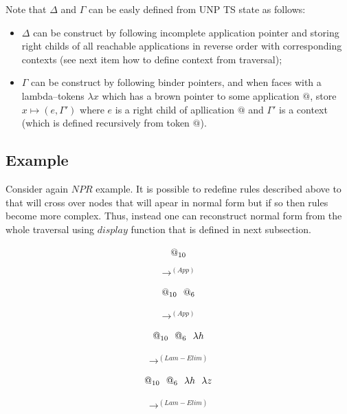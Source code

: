 \documentclass[a4paper, 10pt]{article}
\newcommand{\tikzmark}[3][]{\tikz[remember picture,baseline] \node [inner xsep=0pt,anchor=base,#1](#2) {#3};}
\begin{document}
Note that $\Delta$ and $\Gamma$ can be easly defined from UNP TS state as follows:
\begin{itemize}
\item $\Delta$ can be construct by following incomplete application pointer and storing right childs of all reachable applications in reverse order with corresponding contexts (see next item how to define context from traversal);
\item $\Gamma$ can be construct by following binder pointers, and when faces with a lambda--tokens $\lambda x$ which has a brown pointer to some application $@$, store $x \mapsto (e, \Gamma')$ where $e$ is a right child of apllication $@$ and $\Gamma'$ is a context (which is defined recursively from token $@$).
\end{itemize}

\subsection{Example}
Consider again $NPR$ example. It is possible to redefine rules described above to that will cross over nodes that will apear in normal form but if so then rules become more complex. Thus, instead one can reconstruct normal form from the whole traversal using $display$ function that is defined in next subsection.

\[\tikzmark{}{$@_{10}$}\]
$$\rightarrow^{(App)}$$

\[\tikzmark{1}{$@_{10}$}\ \ \tikzmark{2}{$@_6$}\]
$$\rightarrow^{(App)}$$

\[\tikzmark{1}{$@_{10}$}\ \ \tikzmark{2}{$@_6$}\ \ \tikzmark{3}{$\lambda h$}\]
$$\rightarrow^{(Lam-Elim)}$$

\[\tikzmark{1}{$@_{10}$}\ \ \tikzmark{2}{$@_6$}\ \ \tikzmark{3}{$\lambda h$}\ \ \tikzmark{4}{$\lambda z$}\]
$$\rightarrow^{(Lam-Elim)}$$
\end{document}
